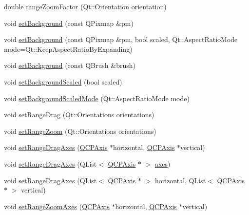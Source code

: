 \begin{DoxyCompactItemize}
\item 
double \mbox{\hyperlink{class_q_c_p_axis_rect_ae4e6c4d143aacc88d2d3c56f117c2fe1}{range\+Zoom\+Factor}} (Qt\+::\+Orientation orientation)
\item 
void \mbox{\hyperlink{class_q_c_p_axis_rect_af615ab5e52b8e0a9a0eff415b6559db5}{set\+Background}} (const Q\+Pixmap \&pm)
\item 
void \mbox{\hyperlink{class_q_c_p_axis_rect_ac48a2d5d9b7732e73b86605c69c5e4c1}{set\+Background}} (const Q\+Pixmap \&pm, bool scaled, Qt\+::\+Aspect\+Ratio\+Mode mode=Qt\+::\+Keep\+Aspect\+Ratio\+By\+Expanding)
\item 
void \mbox{\hyperlink{class_q_c_p_axis_rect_a22a22b8668735438dc06f9a55fe46b33}{set\+Background}} (const Q\+Brush \&brush)
\item 
void \mbox{\hyperlink{class_q_c_p_axis_rect_ae6d36c3e0e968ffb991170a018e7b503}{set\+Background\+Scaled}} (bool scaled)
\item 
void \mbox{\hyperlink{class_q_c_p_axis_rect_a5ef77ea829c9de7ba248e473f48f7305}{set\+Background\+Scaled\+Mode}} (Qt\+::\+Aspect\+Ratio\+Mode mode)
\item 
void \mbox{\hyperlink{class_q_c_p_axis_rect_ae6aef2f7211ba6097c925dcd26008418}{set\+Range\+Drag}} (Qt\+::\+Orientations orientations)
\item 
void \mbox{\hyperlink{class_q_c_p_axis_rect_a7960a9d222f1c31d558b064b60f86a31}{set\+Range\+Zoom}} (Qt\+::\+Orientations orientations)
\item 
void \mbox{\hyperlink{class_q_c_p_axis_rect_a648cce336bd99daac4a5ca3e5743775d}{set\+Range\+Drag\+Axes}} (\mbox{\hyperlink{class_q_c_p_axis}{Q\+C\+P\+Axis}} $\ast$horizontal, \mbox{\hyperlink{class_q_c_p_axis}{Q\+C\+P\+Axis}} $\ast$vertical)
\item 
void \mbox{\hyperlink{class_q_c_p_axis_rect_af0fbc510147a2a54b9c8cd296e6df8ac}{set\+Range\+Drag\+Axes}} (Q\+List$<$ \mbox{\hyperlink{class_q_c_p_axis}{Q\+C\+P\+Axis}} $\ast$ $>$ \mbox{\hyperlink{class_q_c_p_axis_rect_a8db4722cb93e9c4a6f0d91150c200867}{axes}})
\item 
void \mbox{\hyperlink{class_q_c_p_axis_rect_a8366903edcb3bb703a8b0be783a85746}{set\+Range\+Drag\+Axes}} (Q\+List$<$ \mbox{\hyperlink{class_q_c_p_axis}{Q\+C\+P\+Axis}} $\ast$ $>$ horizontal, Q\+List$<$ \mbox{\hyperlink{class_q_c_p_axis}{Q\+C\+P\+Axis}} $\ast$ $>$ vertical)
\item 
void \mbox{\hyperlink{class_q_c_p_axis_rect_a9442cca2aa358405f39a64d51eca13d2}{set\+Range\+Zoom\+Axes}} (\mbox{\hyperlink{class_q_c_p_axis}{Q\+C\+P\+Axis}} $\ast$horizontal, \mbox{\hyperlink{class_q_c_p_axis}{Q\+C\+P\+Axis}} $\ast$vertical)

\end{DoxyCompactItemize}

